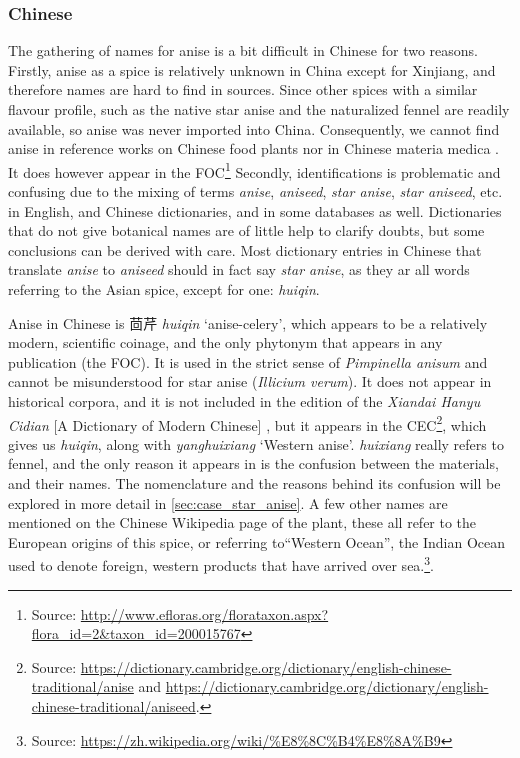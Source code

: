 

\subsubsection{Chinese}



The gathering of names for anise is a bit difficult in Chinese for two reasons. Firstly, anise as a spice is relatively unknown in China except for Xinjiang, and therefore names are hard to find in sources. Since other spices with a similar flavour profile, such as the native star anise and the naturalized fennel are readily available, so anise was never imported into China. Consequently, we cannot find anise in reference works on Chinese food plants nor in Chinese \gls{materia medica} \autocite[see][]{hu_enumeration_1999, hu_food_2005}. It does however appear in the \gls{FOC}\footnote{Source: \url{http://www.efloras.org/florataxon.aspx?flora_id=2&taxon_id=200015767}} Secondly, identifications is problematic and confusing due to the mixing of terms \textit{anise}, \textit{aniseed}, \textit{star anise}, \textit{star aniseed}, etc. in English, and Chinese dictionaries, and in some databases as well. Dictionaries that do not give botanical names are of little help to clarify doubts, but some conclusions can be derived with care. Most dictionary entries in Chinese that translate \textit{anise} to \textit{aniseed} should in fact say \textit{star anise}, as they ar all words referring to the Asian spice, except for one:  \textit{huiqin}.

Anise in Chinese is 茴芹 \textit{huiqin} `anise-celery', which appears to be a relatively modern, scientific coinage, and the only \gls{phytonym} that appears in any publication (the \gls{FOC}). It is used in the strict sense of \textit{Pimpinella anisum} and cannot be misunderstood for star anise (\textit{Illicium verum}). It does not appear in historical corpora, and it is not included in the  edition of the \textit{Xiandai Hanyu Cidian} [A Dictionary of Modern Chinese] \autocite[]{chinese_academy_of_social_sciences_xiandai_2016}, but it appears in the \gls{CEC}\footnote{Source: \url{https://dictionary.cambridge.org/dictionary/english-chinese-traditional/anise} and \url{https://dictionary.cambridge.org/dictionary/english-chinese-traditional/aniseed}.}, which gives us \textit{huiqin}, along with  \textit{yanghuixiang} `Western anise'.  \textit{huixiang} really refers to fennel, and the only reason it appears in \textcite{kleeman_oxford_2010} is the confusion between the materials, and their names. The nomenclature and the reasons behind its confusion will be explored in more detail in \cref{sec:case_star_anise}. A few other names are mentioned on the Chinese Wikipedia page of the plant, these all refer to the European origins of this spice, or referring to``Western Ocean'', the Indian Ocean used to denote foreign, western products that have arrived over sea.\footnote{Source: \url{https://zh.wikipedia.org/wiki/\%E8\%8C\%B4\%E8\%8A\%B9}}. 

